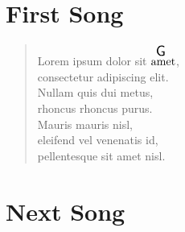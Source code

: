 \documentclass[twocolumn]{article}
\begin{document}
\section*{First Song}

\begin{verse}

Lorem ipsum dolor sit $\overset{ \resizebox{0.3cm}{!}{\textsf{G}} }{\text{amet}}$, \\
consectetur adipiscing elit.\\
Nullam quis dui metus, \\
rhoncus rhoncus purus. \\
Mauris mauris nisl, \\
eleifend vel venenatis id, \\
pellentesque sit amet nisl.

\end{verse}

\section*{Next Song}
\end{document}
